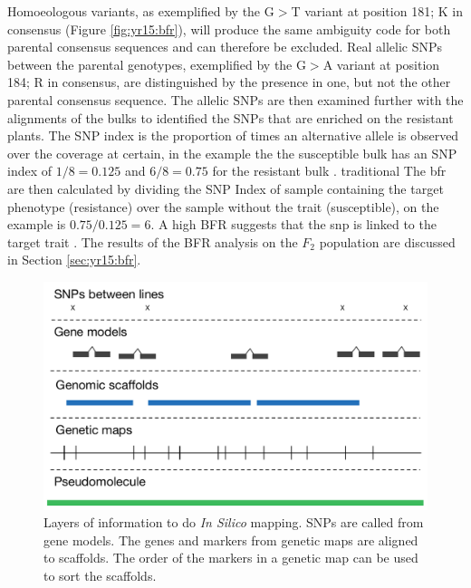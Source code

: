 Homoeologous variants, as exemplified by the G$>$T variant at position 181; K in consensus (Figure \ref{fig:yr15:bfr}), will produce the same ambiguity code for both parental consensus sequences and can therefore be excluded. 
Real allelic SNPs between the parental genotypes, exemplified by the G$>$A variant at position 184; R in consensus, are distinguished by the presence in one, but not the other parental consensus sequence. 
The allelic SNPs are then examined further with the alignments of the bulks to identified the SNPs that are enriched on the resistant plants.
The SNP index is the proportion of times an alternative allele is observed over the coverage at certain, in the example the the susceptible bulk has an SNP index of $1/8=0.125$ and $6/8=0.75$ for the resistant bulk \citep{Takagi2013a}. traditional
The \acrshort{bfr} are then calculated by dividing the SNP Index of sample containing the target phenotype (resistance) over the sample without the trait (susceptible), on the example is $0.75/0.125=6$.  
A high BFR suggests that the \acrshort{snp} is linked to the target trait \citep{Trick2012}. 
The results of the BFR analysis on the $F_2$ population are discussed in Section \ref{sec:yr15:bfr}. 

\begin{figure}
  \centering
  \includegraphics[width=1\textwidth]{Yr15/Figures/mapping/layersOfMapping.pdf}
  \caption{Layers of information to do \textit{In Silico} mapping. SNPs are called from gene models. The genes and markers from genetic maps are aligned to scaffolds. The order of the markers in a genetic map can be used to sort the scaffolds.} 
  \label{fig:yr15:layersOfMapping}
\end{figure}

